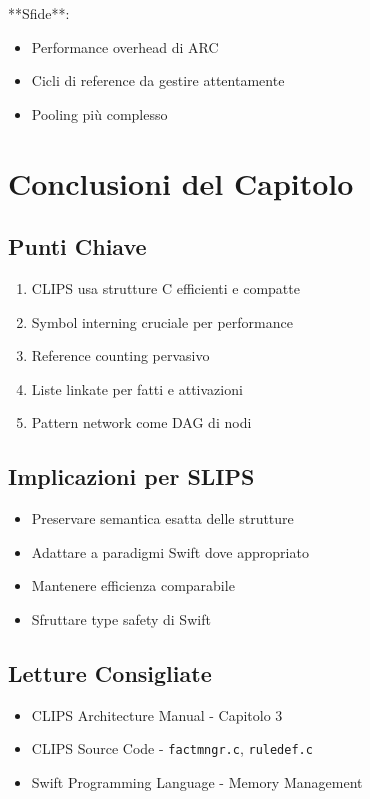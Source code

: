 **Sfide**:
\begin{itemize}
\item Performance overhead di ARC
\item Cicli di reference da gestire attentamente
\item Pooling più complesso
\end{itemize}

\section{Conclusioni del Capitolo}

\subsection{Punti Chiave}

\begin{enumerate}
\item CLIPS usa strutture C efficienti e compatte
\item Symbol interning cruciale per performance
\item Reference counting pervasivo
\item Liste linkate per fatti e attivazioni
\item Pattern network come DAG di nodi
\end{enumerate}

\subsection{Implicazioni per SLIPS}

\begin{itemize}
\item Preservare semantica esatta delle strutture
\item Adattare a paradigmi Swift dove appropriato
\item Mantenere efficienza comparabile
\item Sfruttare type safety di Swift
\end{itemize}

\subsection{Letture Consigliate}

\begin{itemize}
\item CLIPS Architecture Manual - Capitolo 3
\item CLIPS Source Code - \texttt{factmngr.c}, \texttt{ruledef.c}
\item Swift Programming Language - Memory Management
\end{itemize}
